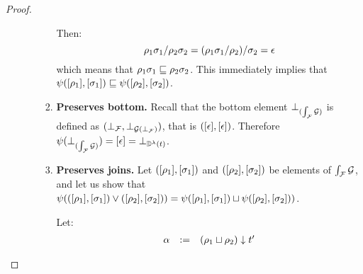 \begin{proof}
\begin{enumerate}
\begin{enumerate}
\begin{enumerate}
      Then:
      \[
        \rho_1\sigma_1/\rho_2\sigma_2
        = (\rho_1\sigma_1/\rho_2)/\sigma_2
        = \epsilon
      \]
      which means that $\rho_1\sigma_1 \sqsubseteq \rho_2\sigma_2$.
      This immediately implies that
      $\psi({[\rho_1]},{[\sigma_1]}) \sqsubseteq \psi({[\rho_2]},{[\sigma_2]})$.
    \item {\bf Preserves bottom.}
      Recall that the bottom element $\bot_{(\int_{\mathcal{F}}{\mathcal{G}})}$
      is defined as $(\bot_{\mathcal{F}}, \bot_{\mathcal{G}(\bot_{\mathcal{F}})})$, that is
      $({[\epsilon]}, {[\epsilon]})$.
      Therefore $\psi(\bot_{(\int_{\mathcal{F}}{\mathcal{G}})}) = {[\epsilon]} = \bot_{\mathbb{D}^{\lambda}(t)}$.
    \item {\bf Preserves joins.}
      Let $({[\rho_1]},{[\sigma_1]})$ and $({[\rho_2]},{[\sigma_2]})$
      be elements of $\int_{\mathcal{F}}{\mathcal{G}}$, and let us show that
      $\psi(({[\rho_1]},{[\sigma_1]}) \lor ({[\rho_2]},{[\sigma_2]})) =
       \psi({[\rho_1]},{[\sigma_1]}) \sqcup \psi({[\rho_2]},{[\sigma_2]}))$.

      Let:
      \[
      \begin{array}{rcl}
        \alpha & := & (\rho_1 \sqcup \rho_2) \downarrow t'
      \end{array}
      \]


\end{enumerate}
\end{enumerate}
\end{enumerate}
\end{proof}

